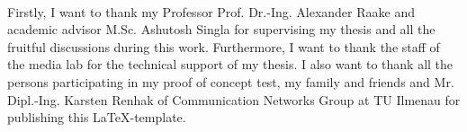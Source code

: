 \cleardoublepage
{}\\[4ex]
Firstly, I want to thank my Professor Prof. Dr.-Ing. Alexander Raake and academic advisor M.Sc. Ashutosh Singla for supervising my thesis and all the fruitful discussions during this work. Furthermore, I want to thank the staff of the media lab for the technical support of my thesis. I also want to thank all the persons participating in my proof of concept test, my family and friends and Mr. Dipl.-Ing. Karsten Renhak of Communication Networks Group at TU Ilmenau for publishing this LaTeX-template.